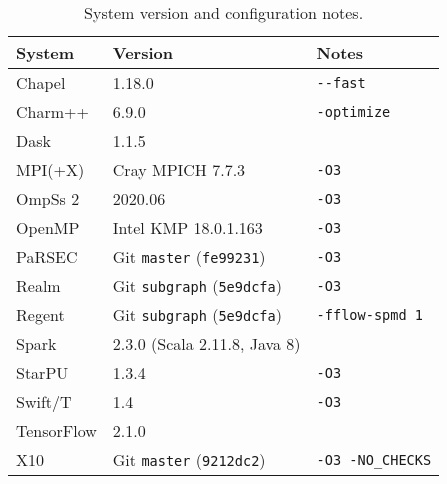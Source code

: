 \begin{table}[t]
\small
\begin{tabular}{@{} l | l | l @{}}
System & Version & Notes \\
\hline
Chapel & 1.18.0 & {\lstinline!--fast!} \\
Charm++ & 6.9.0 & {\lstinline!-optimize!} \\
Dask & 1.1.5 & \\
MPI(+X) & Cray MPICH 7.7.3 & {\lstinline!-O3!} \\
OmpSs 2 & 2020.06 & {\lstinline!-O3!} \\
OpenMP & Intel KMP 18.0.1.163 & {\lstinline!-O3!} \\
PaRSEC & Git {\lstinline!master!} (\lstinline!fe99231!) & {\lstinline!-O3!} \\
Realm & Git {\lstinline!subgraph!} (\lstinline!5e9dcfa!) & {\lstinline!-O3!} \\
Regent & Git {\lstinline!subgraph!} (\lstinline!5e9dcfa!) & {\lstinline!-fflow-spmd 1!} \\
Spark & 2.3.0 (Scala 2.11.8, Java 8) & \\
StarPU & 1.3.4 & {\lstinline!-O3!} \\
Swift/T & 1.4 & {\lstinline!-O3!} \\
TensorFlow & 2.1.0 & \\
X10 & Git {\lstinline!master!} (\lstinline!9212dc2!) & {\lstinline!-O3 -NO_CHECKS!}
\end{tabular}

\caption{System version and configuration notes.\label{tab:flags}}
\vspace{-0.5cm}
\end{table}
